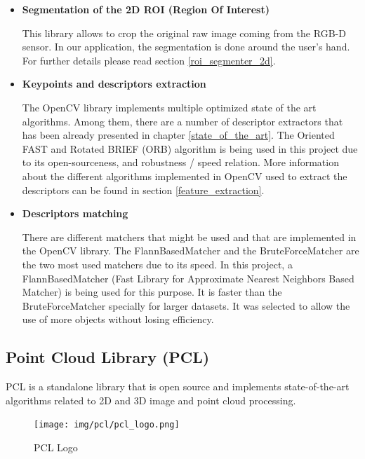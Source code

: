 		\begin{itemize}
		\item\textbf{Segmentation of the 2D ROI (Region Of Interest)\\ }

		This library allows to crop the original raw image coming from the RGB-D sensor. 
		In our application, the segmentation is done around the user's hand. 
		For further details please read section \ref{roi_segmenter_2d}. 
		

		\item\textbf{ {Keypoints and descriptors extraction\\ }}

		 The OpenCV library implements multiple optimized state of the art algorithms. 
		 Among them, there are a number of descriptor extractors that has been already presented in chapter \ref{state_of_the_art}. 
		 The Oriented FAST and Rotated BRIEF (ORB)\cite{orb} algorithm is being used in this project due to its open-sourceness, and robustness / speed relation. 
		 More information about the different algorithms implemented in OpenCV used to extract the descriptors can be found in section \ref{feature_extraction}.


		\item\textbf{ {Descriptors matching\\ } }

		There are different matchers that might be used and that are implemented in the OpenCV library.
		The FlannBasedMatcher and the BruteForceMatcher are the two most used matchers due to its speed. 
		In this project, a FlannBasedMatcher (Fast Library for Approximate Nearest Neighbors Based Matcher) is being used for this purpose. 
		It is faster than the BruteForceMatcher specially for larger datasets. 
		It was selected to allow the use of more objects without losing efficiency. 
		\end{itemize}

	\subsection{Point Cloud Library (PCL)}
\label{pcl}
PCL is a standalone library that is open source and implements state-of-the-art algorithms related to 2D and 3D image and point cloud processing. \\
\begin{figure}[h]
	\begin{center}
    \texttt{[image: img/pcl/pcl\_logo.png]}
	\caption[PCL Logo]{PCL Logo}
	\end{center}
\end{figure}

